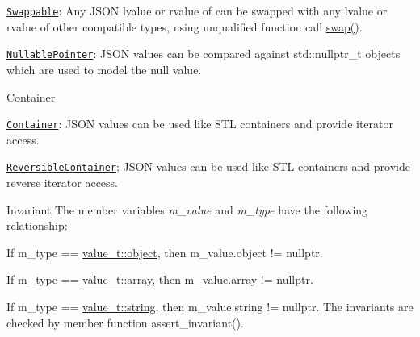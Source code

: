\begin{DoxyItemize}
\begin{DoxyItemize}
\item \href{http://en.cppreference.com/w/cpp/concept/Swappable}{\tt Swappable}\+: Any J\+S\+ON lvalue or rvalue of can be swapped with any lvalue or rvalue of other compatible types, using unqualified function call \mbox{\hyperlink{classnlohmann_1_1basic__json_a8c9d932353e1ab98a7dc2fc27e002031}{swap()}}.
\item \href{http://en.cppreference.com/w/cpp/concept/NullablePointer}{\tt Nullable\+Pointer}\+: J\+S\+ON values can be compared against {\ttfamily std\+::nullptr\+\_\+t} objects which are used to model the {\ttfamily null} value.
\end{DoxyItemize}
\item Container
\begin{DoxyItemize}
\item \href{http://en.cppreference.com/w/cpp/concept/Container}{\tt Container}\+: J\+S\+ON values can be used like S\+TL containers and provide iterator access.
\item \href{http://en.cppreference.com/w/cpp/concept/ReversibleContainer}{\tt Reversible\+Container}; J\+S\+ON values can be used like S\+TL containers and provide reverse iterator access.
\end{DoxyItemize}
\end{DoxyItemize}

\begin{DoxyInvariant}{Invariant}
The member variables {\itshape m\+\_\+value} and {\itshape m\+\_\+type} have the following relationship\+:
\begin{DoxyItemize}
\item If {\ttfamily m\+\_\+type == \mbox{\hyperlink{namespacenlohmann_1_1detail_a90aa5ef615aa8305e9ea20d8a947980faa8cfde6331bd59eb2ac96f8911c4b666}{value\+\_\+t\+::object}}}, then {\ttfamily m\+\_\+value.\+object != nullptr}.
\item If {\ttfamily m\+\_\+type == \mbox{\hyperlink{namespacenlohmann_1_1detail_a90aa5ef615aa8305e9ea20d8a947980faf1f713c9e000f5d3f280adbd124df4f5}{value\+\_\+t\+::array}}}, then {\ttfamily m\+\_\+value.\+array != nullptr}.
\item If {\ttfamily m\+\_\+type == \mbox{\hyperlink{namespacenlohmann_1_1detail_a90aa5ef615aa8305e9ea20d8a947980fab45cffe084dd3d20d928bee85e7b0f21}{value\+\_\+t\+::string}}}, then {\ttfamily m\+\_\+value.\+string != nullptr}. The invariants are checked by member function assert\+\_\+invariant().
\end{DoxyItemize}
\end{DoxyInvariant}


